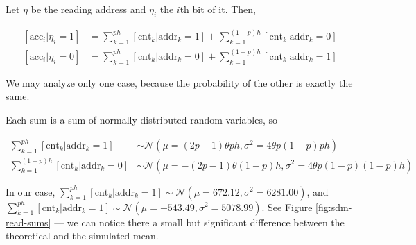 \documentclass[12pt]{article}
\begin{document}
Let $\eta$ be the reading address and $\eta_i$ the $i$th bit of it. Then,

\begin{align}
\left[ \text{acc}_i|\eta_i=1 \right] &= \sum_{k=1}^{ph} \left[ \text{cnt}_k | \text{addr}_k=1 \right] + \sum_{k=1}^{(1-p)h} \left[ \text{cnt}_k | \text{addr}_k=0 \right] \\
\left[ \text{acc}_i|\eta_i=0 \right] &= \sum_{k=1}^{ph} \left[ \text{cnt}_k | \text{addr}_k=0 \right] + \sum_{k=1}^{(1-p)h} \left[ \text{cnt}_k | \text{addr}_k=1 \right]
\end{align}

We may analyze only one case, because the probability of the other is exactly the same.

Each sum is a sum of normally distributed random variables, so

\begin{align}
\sum_{k=1}^{ph} \left[ \text{cnt}_k | \text{addr}_k=1 \right] &\sim \mathcal{N}(\mu = (2p-1) \theta ph, \sigma^2 = 4\theta p(1-p) ph) \label{eqn:sdm-eta1-addr1} \\
\sum_{k=1}^{(1-p)h} \left[ \text{cnt}_k | \text{addr}_k=0 \right] &\sim \mathcal{N}(\mu = -(2p-1) \theta (1-p)h, \sigma^2 = 4\theta p(1-p) (1-p)h) \label{eqn:sdm-eta1-addr0}
\end{align}

In our case, $\sum_{k=1}^{ph} \left[ \text{cnt}_k | \text{addr}_k=1 \right] \sim \mathcal{N}(\mu=672.12, \sigma^2=6281.00)$, and $\sum_{k=1}^{ph} \left[ \text{cnt}_k | \text{addr}_k=1 \right] \sim \mathcal{N}(\mu=-543.49, \sigma^2=5078.99)$. See Figure \ref{fig:sdm-read-sums} --- we can notice there a small but significant difference between the theoretical and the simulated mean.
\end{document}

